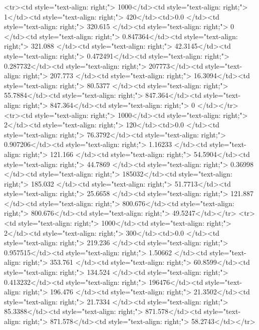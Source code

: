 <tr><td style="text-align: right;">      1000</td><td style="text-align: right;">         1</td><td style="text-align: right;">           420</td><td>0.0          </td><td style="text-align: right;">               320.615 </td><td style="text-align: right;">           0       </td><td style="text-align: right;">         0.847364</td><td style="text-align: right;">        321.088 </td><td style="text-align: right;">            42.3145</td><td style="text-align: right;">               0.472491</td><td style="text-align: right;">             0.287732</td><td style="text-align: right;">              207773</td><td style="text-align: right;">                      207.773 </td><td style="text-align: right;">            16.3094</td><td style="text-align: right;">                80.5377 </td><td style="text-align: right;">        55.7884</td><td style="text-align: right;">    847.364</td><td style="text-align: right;">       847.364</td><td style="text-align: right;">                  0     </td></tr>
<tr><td style="text-align: right;">      1000</td><td style="text-align: right;">         2</td><td style="text-align: right;">           120</td><td>0.0          </td><td style="text-align: right;">                76.3792</td><td style="text-align: right;">           0.907206</td><td style="text-align: right;">         1.16233 </td><td style="text-align: right;">        121.166 </td><td style="text-align: right;">            54.5904</td><td style="text-align: right;">              44.7869  </td><td style="text-align: right;">             0.36998 </td><td style="text-align: right;">              185032</td><td style="text-align: right;">                      185.032 </td><td style="text-align: right;">            51.7713</td><td style="text-align: right;">                25.6658 </td><td style="text-align: right;">       121.887 </td><td style="text-align: right;">    800.676</td><td style="text-align: right;">       800.676</td><td style="text-align: right;">                 49.5247</td></tr>
<tr><td style="text-align: right;">      1000</td><td style="text-align: right;">         2</td><td style="text-align: right;">           300</td><td>0.0          </td><td style="text-align: right;">               219.236 </td><td style="text-align: right;">           0.957515</td><td style="text-align: right;">         1.50662 </td><td style="text-align: right;">        353.761 </td><td style="text-align: right;">            60.8599</td><td style="text-align: right;">             134.524   </td><td style="text-align: right;">             0.413232</td><td style="text-align: right;">              196476</td><td style="text-align: right;">                      196.476 </td><td style="text-align: right;">            21.3502</td><td style="text-align: right;">                21.7334 </td><td style="text-align: right;">        85.3388</td><td style="text-align: right;">    871.578</td><td style="text-align: right;">       871.578</td><td style="text-align: right;">                 58.2743</td></tr>
